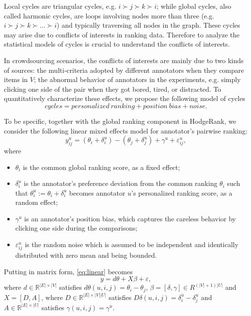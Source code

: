 \documentclass[10pt,journal,cspaper,compsoc]{IEEEtran}
\def\R{{\mathbb R}}        %
\begin{document}
Local cycles are triangular cycles, e.g. $i \succ j \succ k\succ i $; while global cycles, also called harmonic cycles, are loops involving nodes more than three (e.g. $i \succ j \succ k \succ...\succ i$) and typically traversing all nodes in the graph. These cycles may arise due to conflicts of interests in ranking data. Therefore to analyze the statistical models of cycles is crucial to understand the conflicts of interests.

In crowdsourcing scenarios, the conflicts of interests are mainly due to two kinds of sources: the multi-criteria adopted by different annotators when they compare items in $V$; the abnormal behavior of annotators in the experiments, e.g. simply clicking one side of the pair when they got bored, tired, or distracted. To quantitatively characterize these effects, we propose the following model of cycles
\[ cycles = personalized\ ranking + position\ bias + noise. \]

To be specific, together with the global ranking component in HodgeRank, we consider the following linear mixed effects model for annotator's pairwise ranking:
\begin{equation} \label{eq:linear}
y_{ij}^u = (\theta_i+\delta_i^u) - (\theta_j+\delta_j^u) + \gamma^u + \varepsilon_{ij}^u,
\end{equation}
where
\begin{itemize}
\item $\theta_i$ is the common global ranking score, as a fixed effect;
\item $\delta_i^u$ is the annotator's preference deviation from the common ranking $\theta_i$ such that $\theta_i^u:=\theta_i + \delta_i^u$ becomes annotator $u$'s personalized ranking score, as a random effect;
\item $\gamma^u$ is an annotator's position bias, which captures the careless behavior by clicking one side during the comparisons;
\item $\varepsilon_{ij}^u$ is the random noise which is assumed to be independent and identically distributed with zero mean and being bounded.
\end{itemize}

Putting in matrix form, \eqref{eq:linear} becomes
\begin{equation} \label{eq:linear-matrix}
y = d\theta + X\beta + \varepsilon,
\end{equation}
where $d\in \R^{|E| \times |V|}$ satisfies $d\theta(u,i,j) = \theta_i-\theta_j$, $\beta = [\delta, \gamma] \in R^{(|V|+1)|U|}$ and $X =[D,A]$, where $D \in \R^{|E| \times |V| |U|} $ satisfies $D\delta(u,i,j) = \delta^u_i-\delta^u_j$ and $A \in \R^{|E| \times |U|}$ satisfies $\gamma(u,i,j) = \gamma^u$.
\end{document}
